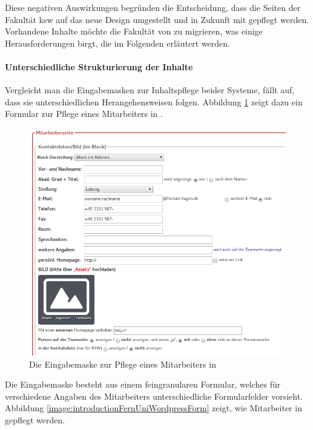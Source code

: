        Diese negativen Auswirkungen 
        begründen die Entscheidung, dass die Seiten der Fakultät \gls{ksw}
        auf das neue Design umgestellt und in Zukunft mit {\imperia} gepflegt werden.
        Vorhandene Inhalte möchte die Fakultät von {\wordpress} zu {\imperia} migrieren,
        was einige Herausforderungen birgt, die im Folgenden erläutert werden.

        \paragraph*{Unterschiedliche Strukturierung der Inhalte}
        Vergleicht man die Eingabemasken zur Inhaltspflege beider Systeme, fällt auf,
        dass sie unterschiedlichen Herangehensweisen folgen.
        Abbildung \ref{image:introductionFernUniImperiaForm} zeigt dazu ein Formular
        zur Pflege eines Mitarbeiters in {\imperia}.

        \begin{figure}[htb]
            \centering
            \includegraphics[scale=0.6]{../resources/imperia/team.png}
            \caption{Die Eingabemaske zur Pflege eines Mitarbeiters in {\imperia}}
            \label{image:introductionFernUniImperiaForm}
        \end{figure}

        Die Eingabemaske besteht aus einem feingranularen Formular,
        welches für verschiedene Angaben des Mitarbeiters unterschiedliche Formularfelder
        vorsieht.
        Abbildung \ref{image:introductionFernUniWordpressForm} zeigt,
        wie Mitarbeiter in {\wordpress} gepflegt werden.

